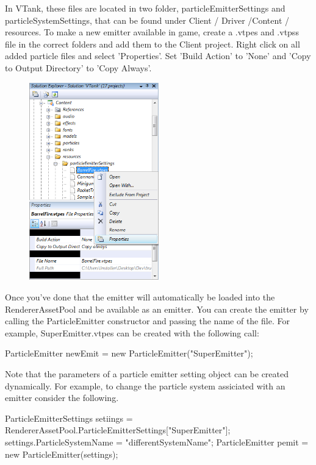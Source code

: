 In VTank, these files are located in two folder, particleEmitterSettings and particleSystemSettings, that can be found under Client / Driver /Content / resources. To make a new emitter available in game, create a .vtpes and .vtpss file in the correct folders and add them to the Client project. Right click on all added particle files and select 'Properties'. Set 'Build Action' to 'None' and 'Copy to Output Directory' to 'Copy Always'. 
\begin{figure}[h]
	\centering
		\includegraphics[width=0.50\textwidth]{Figures/AddParticleFiles.png}
	\label{fig:AddParticleFiles}
\end{figure}

Once you've done that the emitter will automatically be loaded into the RendererAssetPool and be available as an emitter. You can create the emitter by calling the ParticleEmitter constructor and passing the name of the file. For example, SuperEmitter.vtpes can be created with the following call:

ParticleEmitter newEmit = new ParticleEmitter("SuperEmitter");

Note that the parameters of a particle emitter setting object can be created dynamically. For example, to change the particle system assiciated with an emitter consider the following.

ParticleEmitterSettings setiings = RendererAssetPool.ParticleEmitterSettings["SuperEmitter"];
settings.ParticleSystemName = "differentSystemName";
ParticleEmitter pemit = new ParticleEmitter(settings);